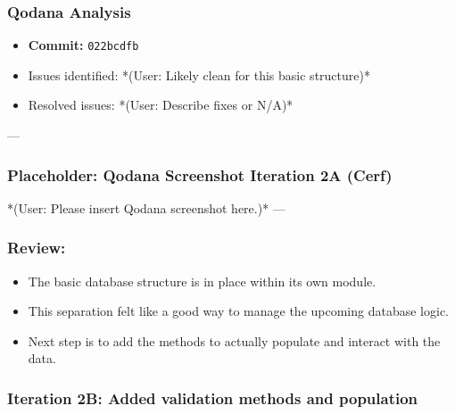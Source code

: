 \subsubsection{Qodana Analysis}
\begin{itemize}
	\item \textbf{Commit:} \verb|022bcdfb|
	\item Issues identified: *(User: Likely clean for this basic structure)*
	\item Resolved issues: *(User: Describe fixes or N/A)*
\end{itemize}

--- %
\subsubsection*{Placeholder: Qodana Screenshot Iteration 2A (Cerf)}
*(User: Please insert Qodana screenshot here.)*
---

\subsubsection{Review:}
\begin{itemize}
	\item The basic database structure is in place within its own module.
	\item This separation felt like a good way to manage the upcoming database logic.
	\item Next step is to add the methods to actually populate and interact with the data.
\end{itemize}

\newpage

\subsubsection{Iteration 2B: Added validation methods and population}

